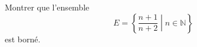 \documentclass[a4paper,12pt]{report}
\begin{document}
Montrer que l'ensemble 
\[E = \left\{\frac{n+1}{n+2}\middle| n\in\mathbb{N} \right\} \]
est borné. 
\end{document}
